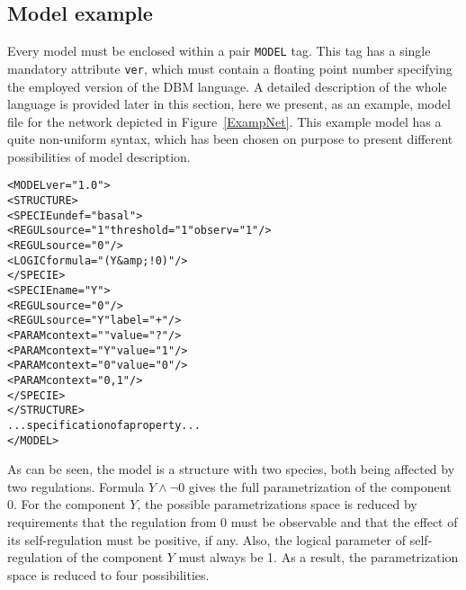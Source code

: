 \documentclass[12pt]{article}
\begin{document}
\subsection{Model example}
Every model must be enclosed within a pair \texttt{MODEL} tag. This tag has a single mandatory attribute \texttt{ver}, which must contain a floating point number specifying the employed version of the DBM language. A detailed description of the whole language is provided later in this section, here we present, as an example, model file for the network depicted in Figure~\ref{ExampNet}. This example model has a quite non-uniform syntax, which has been chosen on purpose to present different possibilities of model description.
\begin{alltt}
<MODEL ver="1.0">
    <STRUCTURE>
        <SPECIE undef="basal">
            <REGUL source="1" threshold ="1" observ="1" />
            <REGUL source="0" />            
            <LOGIC formula="(Y &amp; !0)" />
        </SPECIE>
        <SPECIE name="Y">
            <REGUL source="0" />
            <REGUL source="Y" label="+" />            
            <PARAM context="" value="?" />
            <PARAM context="Y" value="1" />
            <PARAM context="0" value="0" />
            <PARAM context="0,1" />            
        </SPECIE>
    </STRUCTURE>
    ... specification of a property ...
</MODEL>
\end{alltt}
As can be seen, the model is a structure with two species, both being affected by two regulations. Formula $Y \wedge \neg 0$ gives the full parametrization of the component $0$. For the component $Y$, the possible parametrizations space is reduced by requirements that the regulation from $0$ must be observable and that the effect of its self-regulation must be positive, if any. Also, the logical parameter of self-regulation of the component $Y$ must always be 1. As a result, the parametrization space is reduced to four possibilities.
\end{document}
